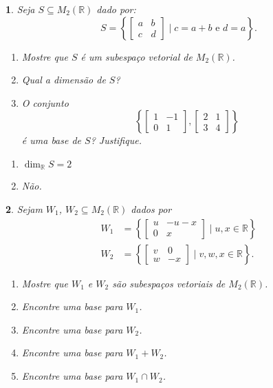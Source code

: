 \documentclass[12pt]{exam}
\newtheorem{exercicio}{}
\newcommand{\real}{\mathbb{R}}
\begin{document}
\begin{exercicio}
  Seja $S \subseteq M_2(\real)$ dado por:
  \[
    S = \left\{\begin{bmatrix}
      a & b\\c & d
    \end{bmatrix} \mid c = a+b \mbox{ e } d = a\right\}.
  \]
  \begin{enumerate}[label={\alph*})]
    \item Mostre que $S$ \'e um subespa\c{c}o vetorial de $M_2(\real)$.
    \item Qual a dimens\~ao de $S$?
    \item O conjunto
    \[
      \left\{\begin{bmatrix}
        1 & -1\\0 & 1
      \end{bmatrix}, \begin{bmatrix}
        2 & 1\\3 & 4
      \end{bmatrix}\right\}
    \]
    \'e uma base de $S$? Justifique.
  \end{enumerate}
  \begin{solucao}
    \begin{enumerate}[label={\alph*})]
      \item $\dim_\real S = 2$
      \item N\~ao.
    \end{enumerate}
  \end{solucao}
\end{exercicio}

\begin{exercicio}
  Sejam $W_1$, $W_2 \subseteq M_2(\real)$ dados por
  \begin{align*}
    W_1 &= \left\{ \begin{bmatrix}
      u & -u -x\\
      0 & x
    \end{bmatrix} \mid u, x \in \real\right\}\\
    W_2 &= \left\{ \begin{bmatrix}
      v & 0\\
      w & -x
    \end{bmatrix} \mid v, w, x \in \real\right\}.
  \end{align*}
  \begin{enumerate}[label={\alph*})]
    \item Mostre que $W_1$ e $W_2$ s\~ao subespa\c{c}os vetoriais de $M_2(\real)$.
    \item Encontre uma base para $W_1$.
    \item Encontre uma base para $W_2$.
    \item Encontre uma base para $W_1 + W_2$.
    \item Encontre uma base para $W_1 \cap W_2$.
  \end{enumerate}
\end{exercicio}
\end{document}
